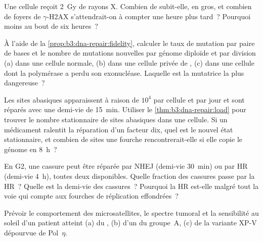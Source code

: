 \begin{exercise}[$\star$]\label{exo:b3:dna-repair:4}
Une cellule reçoit \qty{2}{Gy} de rayons X. Combien de  subit-elle, en gros, et combien de foyers de $\gamma$-H2AX
s'attendrait-on à compter une heure plus tard~? Pourquoi moins au bout
de six heures~?
\end{exercise}

\begin{exercise}[$\star\star$]\label{exo:b3:dna-repair:5}
À l'aide de la \cref{prop:b3:dna-repair:fidelity}, calculer le taux de
mutation par paire de bases et le nombre de mutations nouvelles par
génome diploïde et par division (a) dans une cellule normale, (b) dans
une cellule privée de , (c) dans une
cellule dont la polymérase a perdu son exonucléase. Laquelle est la
mutatrice la plus dangereuse~?
\end{exercise}

\begin{exercise}[$\star\star$]\label{exo:b3:dna-repair:6}
Les sites abasiques apparaissent à raison de $10^{4}$ par cellule et
par jour et sont réparés avec une demi-vie de \qty{15}{min}. Utiliser
le \cref{thm:b3:dna-repair:load} pour trouver le nombre stationnaire de
sites abasiques dans une cellule. Si un médicament ralentit la
réparation d'un facteur dix, quel est le nouvel état stationnaire, et
combien de sites une fourche rencontrerait-elle si elle copie le génome
en \qty{8}{h}~?
\end{exercise}

\begin{exercise}[$\star\star$]\label{exo:b3:dna-repair:7}
En G2, une cassure peut être réparée par NHEJ (demi-vie \qty{30}{min})
ou par HR (demi-vie \qty{4}{h}), toutes deux disponibles. Quelle
fraction des cassures passe par la HR~? Quelle est la demi-vie des
cassures~? Pourquoi la HR est-elle malgré tout la voie qui compte aux
fourches de réplication effondrées~?
\end{exercise}

\begin{exercise}[$\star\star$]\label{exo:b3:dna-repair:8}
Prévoir le comportement des microsatellites, le spectre tumoral et la
sensibilité au soleil d'un patient atteint (a) du ,
(b) d'un  du groupe~A, (c) de la variante XP-V
dépourvue de Pol~$\eta$.
\end{exercise}

